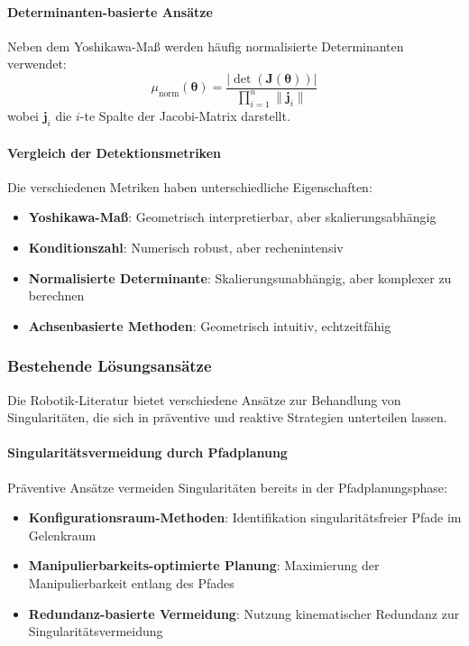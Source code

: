 \paragraph{Determinanten-basierte Ansätze}
Neben dem Yoshikawa-Maß werden häufig normalisierte Determinanten verwendet:
\begin{equation}
    \mu_{\text{norm}}(\boldsymbol{\theta}) = \frac{|\det(\mathbf{J}(\boldsymbol{\theta}))|}{\prod_{i=1}^{n} \|\mathbf{j}_i\|}
    \label{eq:normalized_determinant}
\end{equation}
wobei $\mathbf{j}_i$ die $i$-te Spalte der Jacobi-Matrix darstellt.

\paragraph{Vergleich der Detektionsmetriken}
Die verschiedenen Metriken haben unterschiedliche Eigenschaften:

\begin{itemize}
    \item \textbf{Yoshikawa-Maß}: Geometrisch interpretierbar, aber skalierungsabhängig
    \item \textbf{Konditionszahl}: Numerisch robust, aber rechenintensiv
    \item \textbf{Normalisierte Determinante}: Skalierungsunabhängig, aber komplexer zu berechnen
    \item \textbf{Achsenbasierte Methoden}: Geometrisch intuitiv, echtzeitfähig
\end{itemize}

\subsubsection{Bestehende Lösungsansätze}
\label{sssec:Literatur_Loesungsansaetze}

Die Robotik-Literatur bietet verschiedene Ansätze zur Behandlung von
Singularitäten, die sich in präventive und reaktive Strategien unterteilen
lassen.

\paragraph{Singularitätsvermeidung durch Pfadplanung}
Präventive Ansätze vermeiden Singularitäten bereits in der Pfadplanungsphase:

\begin{itemize}
    \item \textbf{Konfigurationsraum-Methoden}: Identifikation singularitätsfreier Pfade im Gelenkraum \cite{latombe1991robot}
    \item \textbf{Manipulierbarkeits-optimierte Planung}: Maximierung der Manipulierbarkeit entlang des Pfades \cite{vahrenkamp2009manipulability}
    \item \textbf{Redundanz-basierte Vermeidung}: Nutzung kinematischer Redundanz zur Singularitätsvermeidung \cite{siciliano1990kinematically}
\end{itemize}

